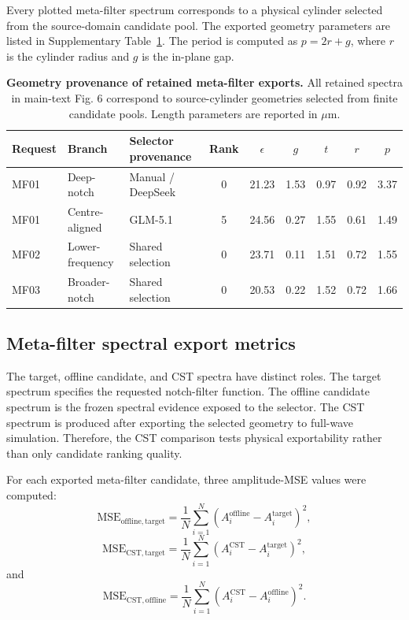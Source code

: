 \documentclass[final,1p,times]{elsarticle}
\begin{document}
Every plotted meta-filter spectrum corresponds to a physical cylinder selected from the source-domain candidate pool. The exported geometry parameters are listed in Supplementary Table~\ref{tab:si_phase6_metafilter_geometry}. The period is computed as $p=2r+g$, where $r$ is the cylinder radius and $g$ is the in-plane gap.

\begin{table}[htbp!]
\centering
\caption{\textbf{Geometry provenance of retained meta-filter exports.}
All retained spectra in main-text Fig. 6 correspond to source-cylinder geometries selected from finite candidate pools. Length parameters are reported in $\mu$m.}
\label{tab:si_phase6_metafilter_geometry}
\small
\setlength{\tabcolsep}{4.2pt}
\renewcommand{\arraystretch}{1.12}
\begin{tabular}{lllcccccc}
\toprule
Request & Branch & Selector provenance & Rank & $\epsilon$ & $g$ & $t$ & $r$ & $p$ \\
\midrule
MF01 & Deep-notch & Manual / DeepSeek & 0 & 21.23 & 1.53 & 0.97 & 0.92 & 3.37 \\
MF01 & Centre-aligned & GLM-5.1 & 5 & 24.56 & 0.27 & 1.55 & 0.61 & 1.49 \\
MF02 & Lower-frequency & Shared selection & 0 & 23.71 & 0.11 & 1.51 & 0.72 & 1.55 \\
MF03 & Broader-notch & Shared selection & 0 & 20.53 & 0.22 & 1.52 & 0.72 & 1.66 \\
\bottomrule
\end{tabular}
\end{table}

\subsection{Meta-filter spectral export metrics}

The target, offline candidate, and CST spectra have distinct roles. The target spectrum specifies the requested notch-filter function. The offline candidate spectrum is the frozen spectral evidence exposed to the selector. The CST spectrum is produced after exporting the selected geometry to full-wave simulation. Therefore, the CST comparison tests physical exportability rather than only candidate ranking quality.

For each exported meta-filter candidate, three amplitude-MSE values were computed:
\begin{equation}
\mathrm{MSE}_{\mathrm{offline,target}}
=
\frac{1}{N}
\sum_{i=1}^{N}
\left(
A_i^{\mathrm{offline}}-A_i^{\mathrm{target}}
\right)^2,
\end{equation}
\begin{equation}
\mathrm{MSE}_{\mathrm{CST,target}}
=
\frac{1}{N}
\sum_{i=1}^{N}
\left(
A_i^{\mathrm{CST}}-A_i^{\mathrm{target}}
\right)^2,
\end{equation}
and
\begin{equation}
\mathrm{MSE}_{\mathrm{CST,offline}}
=
\frac{1}{N}
\sum_{i=1}^{N}
\left(
A_i^{\mathrm{CST}}-A_i^{\mathrm{offline}}
\right)^2.
\end{equation}
\end{document}
